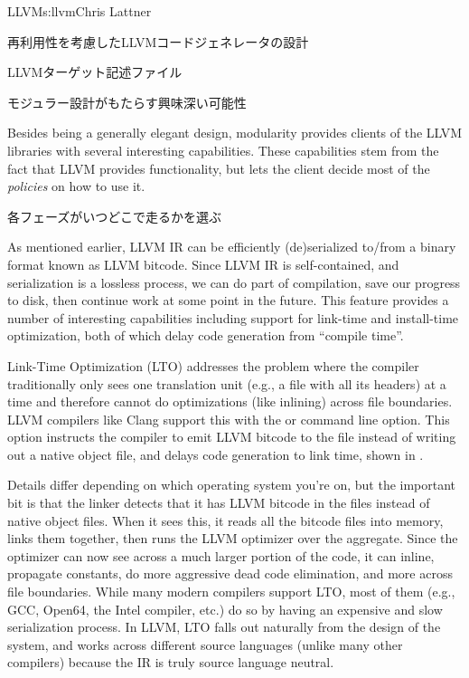 \begin{aosachapter}{LLVM}{s:llvm}{Chris Lattner}
\begin{aosasect1}{再利用性を考慮したLLVMコードジェネレータの設計}
\begin{aosasect2}{LLVMターゲット記述ファイル}
\end{aosasect2}

\end{aosasect1}

\begin{aosasect1}{モジュラー設計がもたらす興味深い可能性}

Besides being a generally elegant design, modularity provides clients
of the LLVM libraries with several interesting capabilities. These
capabilities stem from the fact that LLVM provides functionality, but
lets the client decide most of the \emph{policies} on how to use it.

\begin{aosasect2}{各フェーズがいつどこで走るかを選ぶ}

As mentioned earlier, LLVM IR can be efficiently (de)serialized
to/from a binary format known as LLVM bitcode.  Since LLVM IR is
self-contained, and serialization is a lossless process, we can do
part of compilation, save our progress to disk, then continue work at
some point in the future.  This feature provides a number of
interesting capabilities including support for link-time and
install-time optimization, both of which delay code generation from
``compile time''.

Link-Time Optimization (LTO) addresses the problem where the compiler
traditionally only sees one translation unit (e.g., a  file
with all its headers) at a time and therefore cannot do optimizations
(like inlining) across file boundaries.  LLVM compilers like Clang
support this with the  or  command line option.
This option instructs the compiler to emit LLVM bitcode to the
file instead of writing out a native object file, and delays
code generation to link time, shown in .


Details differ depending on which operating system you're on, but the
important bit is that the linker detects that it has LLVM bitcode in
the  files instead of native object files.  When it sees
this, it reads all the bitcode files into memory, links them together,
then runs the LLVM optimizer over the aggregate.  Since the optimizer
can now see across a much larger portion of the code, it can inline,
propagate constants, do more aggressive dead code elimination, and
more across file boundaries.  While many modern compilers support LTO,
most of them (e.g., GCC, Open64, the Intel compiler, etc.) do so by
having an expensive and slow serialization process.  In LLVM, LTO
falls out naturally from the design of the system, and works across
different source languages (unlike many other compilers) because the
IR is truly source language neutral.


\end{aosasect2}
\end{aosasect1}
\end{aosachapter}
